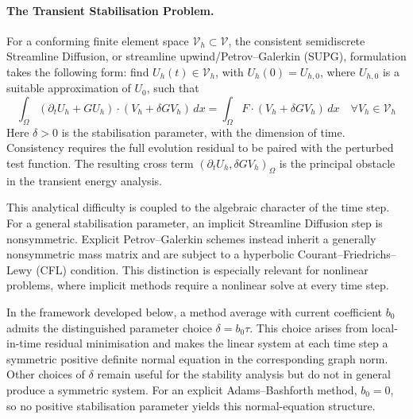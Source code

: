 \documentclass[11pt]{article}
\begin{document}
\paragraph{The Transient Stabilisation Problem.}
For a conforming finite element space \(\mathcal V_h\subset\mathcal V\), the
consistent semidiscrete Streamline Diffusion, or streamline
upwind/Petrov--Galerkin (SUPG), formulation takes the following form: find
\(U_h(t)\in\mathcal V_h\), with
\(U_h(0)=U_{h,0}\), where \(U_{h,0}\) is a suitable approximation of \(U_0\),
such that
\begin{equation}
\int_{\Omega}(\partial_tU_h+GU_h)\cdot(V_h+\delta GV_h)\,dx
=\int_{\Omega}F\cdot(V_h+\delta GV_h)\,dx
\quad \forall V_h\in\mathcal V_h \label{eq:introduction-supg-form}
\end{equation}
Here \(\delta>0\) is the stabilisation parameter, with the dimension of time.
Consistency requires the full
evolution residual to be paired with the perturbed test function. The
resulting cross term \((\partial_tU_h,\delta GV_h)_{\Omega}\) is the principal
obstacle in the transient energy analysis.

This analytical difficulty is coupled to the algebraic character of the time
step. For a general stabilisation parameter, an implicit Streamline Diffusion
step is nonsymmetric. Explicit Petrov--Galerkin schemes instead inherit a
generally nonsymmetric mass matrix and are subject to a hyperbolic
Courant--Friedrichs--Lewy (CFL) condition. This distinction is especially
relevant for nonlinear problems,
where implicit methods require a nonlinear solve at every time step.

In the framework developed below, a method average with current coefficient
\(b_0\) admits the distinguished parameter choice \(\delta=b_0\tau\). This
choice arises from local-in-time residual minimisation
\cite{BM04,FGK25} and makes the linear system at each time step a symmetric
positive definite normal equation in the corresponding graph norm. Other
choices of \(\delta\) remain useful for the stability analysis but do not in
general produce a symmetric system. For an explicit Adams--Bashforth method,
\(b_0=0\), so no positive stabilisation parameter yields this normal-equation
structure.
\end{document}
